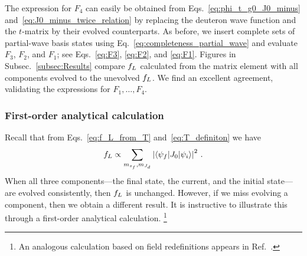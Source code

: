 	The expression for $F_4$ can easily be obtained from
	Eqs.~\eqref{eq:phi_t_g0_J0_minus} and~\eqref{eq:J0_minus_twice_relation} by
	replacing the deuteron wave function and the $t$-matrix by their evolved
	counterparts.  As before, we insert complete sets of partial-wave basis states
	using Eq.~\eqref{eq:completeness_partial_wave} and evaluate $F_3$, $F_2$,
	and $F_1$; see Eqs.~\eqref{eq:F3}, \eqref{eq:F2}, and \eqref{eq:F1}.
	Figures in Subsec.~\ref{subsec:Results} compare $f_L$ calculated
	from the matrix element with all components evolved to the unevolved $f_L$.
	We find an excellent
	agreement, validating the expressions for $F_1, \ldots, F_4$.

	\medskip

	\subsubsection{First-order analytical calculation}

	Recall that from Eqs.~\eqref{eq:f_L_from_T} and~\eqref{eq:T_definiton} we have
	\begin{equation}
	 f_L \propto \sum_{m_{s_f}, m_{J_d}}\left|\langle \psi_f|J_0|\psi_i\rangle\right|^2 \,.
	\label{eq:fl_prop_matrix_element}
	\end{equation}
	When all three components---the final state, the current, and the initial
	state---are evolved consistently, then $f_L$ is unchanged.  However, if we
	miss evolving a component, then we obtain a different result.  It is
	instructive to
	illustrate this through a first-order analytical calculation.%
	\footnote{An analogous calculation based on field redefinitions appears
	in Ref.~\cite{Furnstahl:2001xq}.}

